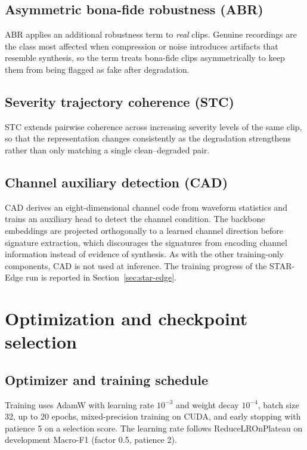 \subsection{Asymmetric bona-fide robustness (ABR)}

ABR applies an additional robustness term to \emph{real} clips. Genuine recordings are the class most affected when compression or noise introduces artifacts that resemble synthesis, so the term treats bona-fide clips asymmetrically to keep them from being flagged as fake after degradation.

\subsection{Severity trajectory coherence (STC)}

STC extends pairwise coherence across increasing severity levels of the same clip, so that the representation changes consistently as the degradation strengthens rather than only matching a single clean--degraded pair.

\subsection{Channel auxiliary detection (CAD)}

CAD derives an eight-dimensional channel code from waveform statistics and trains an auxiliary head to detect the channel condition. The backbone embeddings are projected orthogonally to a learned channel direction before signature extraction, which discourages the signatures from encoding channel information instead of evidence of synthesis. As with the other training-only components, CAD is not used at inference. The training progress of the STAR-Edge run is reported in Section~\ref{sec:star-edge}.

\section{Optimization and checkpoint selection}
\label{sec:optimization}

\subsection{Optimizer and training schedule}

Training uses AdamW with learning rate $10^{-3}$ and weight decay $10^{-4}$, batch size 32, up to 20 epochs, mixed-precision training on CUDA, and early stopping with patience 5 on a selection score. The learning rate follows ReduceLROnPlateau on development Macro-F1 (factor 0.5, patience 2).

